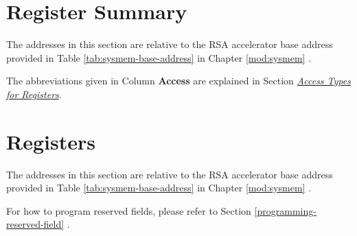 \documentclass[main\_\_EN.tex]{subfiles}
\begin{document}
\section{Register Summary}
\label{sec:rsa-reg-summ}


The addresses in this section are relative to the RSA accelerator base address provided in Table \ref{tab:sysmem-base-address} in Chapter \ref{mod:sysmem} \textit{}.

The abbreviations given in Column \textbf{Access} are explained in Section \hyperref[glossary-access-types]{\textit{Access Types for Registers}}.





\newpage
\section{Registers}

The addresses in this section are relative to the RSA accelerator base address provided in Table \ref{tab:sysmem-base-address} in Chapter \ref{mod:sysmem} \textit{}.

For how to program reserved fields, please refer to Section \ref{programming-reserved-field} \textit{}.


\end{document}
